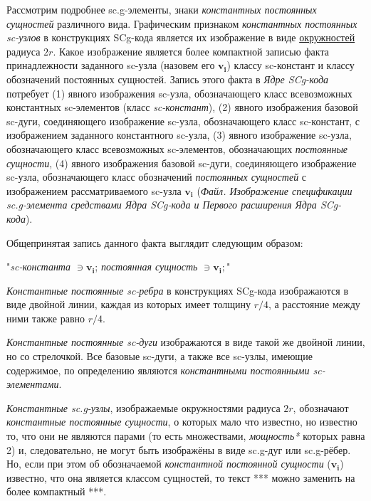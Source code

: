 \begin{SCn}
{Рассмотрим подробнее sc.g-элементы, знаки \textit{константных постоянных сущностей} различного вида. Графическим признаком \textit{константных постоянных sc-узлов} в конструкциях SCg-кода является их изображение в виде \uline{окружностей} радиуса $2r$. Какое изображение является более компактной записью факта принадлежности заданного sc-узла (назовем его $\bm{v_i}$) классу sc-констант и классу обозначений постоянных сущностей. Запись этого факта в \textit{Ядре SCg-кода} потребует (1) явного изображения sc-узла, обозначающего класс всевозможных константных sc-элементов (класс \textit{sc-констант}), (2) явного изображения базовой sc-дуги, соединяющего изображение sc-узла, обозначающего класс sc-констант, с изображением заданного константного sc-узла, (3) явного изображение sc-узла, обозначающего класс всевозможных sc-элементов, обозначающих \textit{постоянные сущности}, (4) явного изображения базовой sc-дуги, соединяющего изображение sc-узла, обозначающего класс обозначений \textit{постоянных сущностей} с изображением рассматриваемого sc-узла $\bm{v_i}$ (\textit{Файл. Изображение спецификации sc.g-элемента средствами Ядра SCg-кода и Первого расширения Ядра SCg-кода}).

Общепринятая запись данного факта выглядит следующим образом:

"\textit{sc-константа} $\ni \bm{v_i}$; \textit{постоянная сущность} $\ni \bm{v_i};$"

\textit{Константные постоянные sc-ребра} в конструкциях SCg-кода изображаются в виде двойной линии, каждая из которых имеет толщину $r/4$, а расстояние между ними также равно $r/4$. 

\textit{Константные постоянные sc-дуги} изображаются в виде такой же двойной линии, но со стрелочкой. Все базовые sc-дуги, а также все sc-узлы, имеющие содержимое, по определению являются \textit{константными постоянными sc-элементами}. 

\textit{Константные sc.g-узлы}, изображаемые окружностями радиуса $2r$, обозначают \textit{константные постоянные сущности}, о которых мало что известно, но известно то, что они не являются парами (то есть множествами, \textit{мощность*} которых равна 2) и, следовательно, не могут быть изображёны в виде sc.g-дуг или sc.g-рёбер. Но, если при этом об обозначаемой \textit{константной постоянной сущности} ($\bm{v_i}$) известно, что она является классом сущностей, то текст *** можно заменить на более компактный ***. 

}
\end{SCn}
